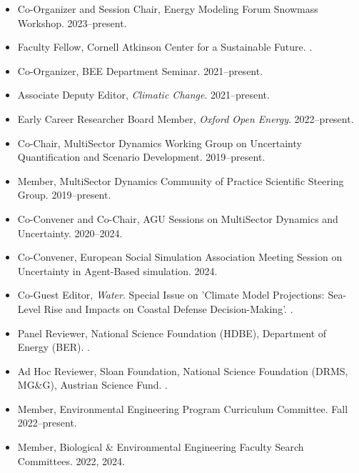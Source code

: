 \documentclass[11pt,article,oneside]{memoir}
\begin{document}
\begin{itemize}[label={}]

\item Co-Organizer and Session Chair, Energy Modeling Forum Snowmass Workshop. 2023--present.

\item Faculty Fellow, Cornell Atkinson Center for a Sustainable Future. .

\item Co-Organizer, BEE Department Seminar. 2021--present.

\item Associate Deputy Editor, \emph{Climatic Change}.  2021--present.

\item Early Career Researcher Board Member, \emph{Oxford Open Energy}.  2022--present.

\item Co-Chair, MultiSector Dynamics Working Group on Uncertainty Quantification and Scenario Development. 2019--present.

\item Member, MultiSector Dynamics Community of Practice Scientific Steering Group. 2019--present.

\item Co-Convener and Co-Chair, AGU Sessions on MultiSector Dynamics and Uncertainty. 2020--2024.

\item Co-Convener, European Social Simulation Association Meeting Session on Uncertainty in Agent-Based simulation. 2024.

\item Co-Guest Editor, \emph{Water}. Special Issue on 'Climate Model Projections: Sea-Level Rise and Impacts on Coastal Defense Decision-Making'. .

\item Panel Reviewer, National Science Foundation (HDBE), Department of Energy (BER). .

\item Ad Hoc Reviewer, Sloan Foundation, National Science Foundation (DRMS, MG\&G), Austrian Science Fund. .

\item Member, Environmental Engineering Program Curriculum Committee. Fall 2022--present.

\item Member, Biological \& Environmental Engineering Faculty Search Committees. 2022, 2024.

\end{itemize}
\end{document}
